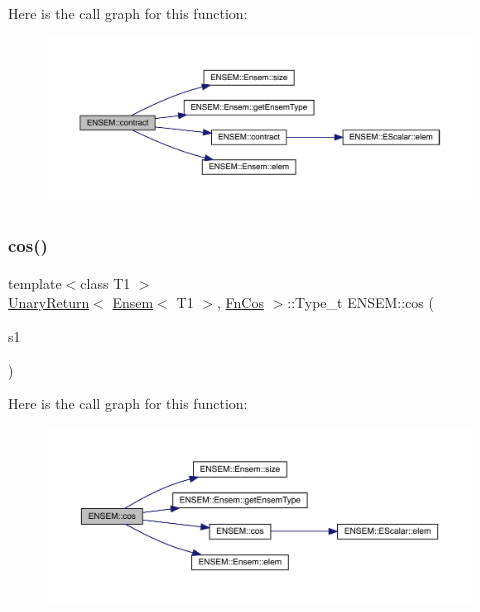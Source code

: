 Here is the call graph for this function\+:\nopagebreak
\begin{figure}[H]
\begin{center}
\leavevmode
\includegraphics[width=350pt]{d1/d9e/group__eensem_ga1ad11b55c96293cf6f5e776c6c9d0f1b_cgraph}
\end{center}
\end{figure}
\mbox{\label{group__eensem_gac1023736758024ac0b3d64cf9021b716}} 
\subsubsection{\texorpdfstring{cos()}{cos()}}
{\footnotesize\ttfamily template$<$class T1 $>$ \\
\mbox{\hyperlink{structENSEM_1_1UnaryReturn}{Unary\+Return}}$<$ \mbox{\hyperlink{classENSEM_1_1Ensem}{Ensem}}$<$ T1 $>$, \mbox{\hyperlink{structENSEM_1_1FnCos}{Fn\+Cos}} $>$\+::Type\+\_\+t E\+N\+S\+E\+M\+::cos (\begin{DoxyParamCaption}\item[{const \mbox{\hyperlink{classENSEM_1_1Ensem}{Ensem}}$<$ T1 $>$ \&}]{s1 }\end{DoxyParamCaption})\hspace{0.3cm}{\ttfamily [inline]}}

Here is the call graph for this function\+:\nopagebreak
\begin{figure}[H]
\begin{center}
\leavevmode
\includegraphics[width=350pt]{d1/d9e/group__eensem_gac1023736758024ac0b3d64cf9021b716_cgraph}
\end{center}
\end{figure}
\mbox{\label{group__eensem_gaaf138ac5ffa49ae31d5a073a994dc4c3}} 
